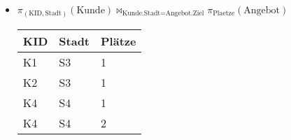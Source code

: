 \documentclass{bschlangaul-aufgabe}
\begin{document}
\begin{enumerate}
\begin{itemize}
%

\item $
\pi_{(\text{KID},\text{Stadt})} (\text{Kunde})
\bowtie_{\text{Kunde.Stadt} = \text{Angebot.Ziel}}
\pi_{\text{Plaetze}} (\text{Angebot})$

\begin{bAntwort}

\begin{tabular}{|l|l|l|}
\hline
KID & Stadt & Plätze \\\hline\hline
K1 & S3 & 1 \\\hline
K2 & S3 & 1 \\\hline
K4 & S4 & 1 \\\hline
K4 & S4 & 2 \\\hline
\end{tabular}
\end{bAntwort}
\end{itemize}
\end{enumerate}
\end{document}
